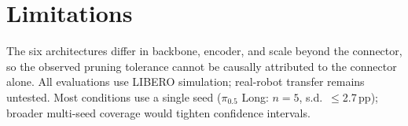 \section{Limitations}
\label{sec:limitations}

The six architectures differ in backbone, encoder, and scale beyond the connector, so the observed pruning tolerance cannot be causally attributed to the connector alone. All evaluations use LIBERO simulation; real-robot transfer remains untested. Most conditions use a single seed ($\pi_{0.5}$ Long: $n{=}5$, s.d.\ ${\leq}$2.7\,pp); broader multi-seed coverage would tighten confidence intervals.
